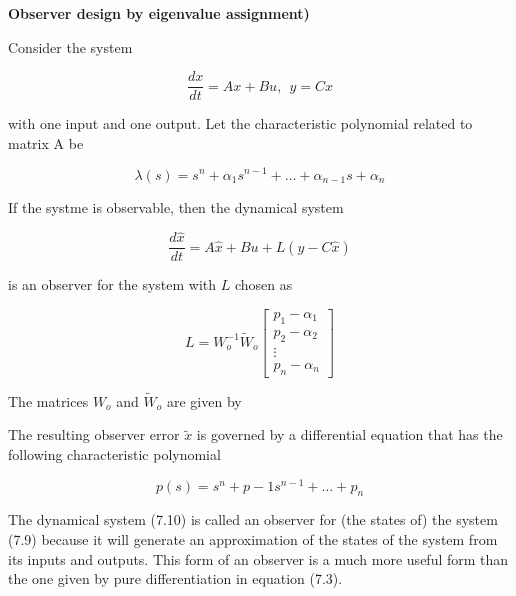 \begin{framed}
\theoremstyle{theorem}
\begin{theorem}{\textbf{Observer design by eigenvalue assignment)}}


Consider the system

\begin{equation}
\frac{dx}{dt} = Ax + Bu, ~~ y =Cx   \nonumber
\end{equation} 

with one input and one output. Let the characteristic polynomial related to matrix A be

\begin{equation}
\lambda(s) = s^n + \alpha_1 s^{n-1} + \ldots + \alpha_{n-1}s + \alpha_n \nonumber
\end{equation}

If the systme is observable, then the dynamical system

\begin{equation}
\frac{d \hat{x}}{dt} = A\hat{x} + Bu + L(y- C \hat{x})  \nonumber
\end{equation}


is an observer for the system with $L$ chosen as 

\begin{equation}
L = W_{o}^{-1}\tilde{W}_o
\begin{bmatrix}
 p_1 - \alpha_1 \\
 p_2 - \alpha_2 \\
 \vdots  \\
 p_n - \alpha_n
\end{bmatrix} \nonumber
\end{equation}

The matrices $W_{o}$ and $\tilde{W}_{o}$ are given by

The resulting observer error $\tilde{x}$ is governed by a differential equation that has the following characteristic polynomial

\begin{equation}
p(s) = s^n +  p-1 s^{n-1} + \ldots + p_n  \nonumber
\end{equation}
\end{theorem}
\end{framed}

The dynamical system (7.10) is called an observer for (the states of) the system (7.9) because it will generate an approximation of the states of the system from its inputs and outputs. This form of an observer is a much more useful form than the one given by pure differentiation in equation (7.3).


